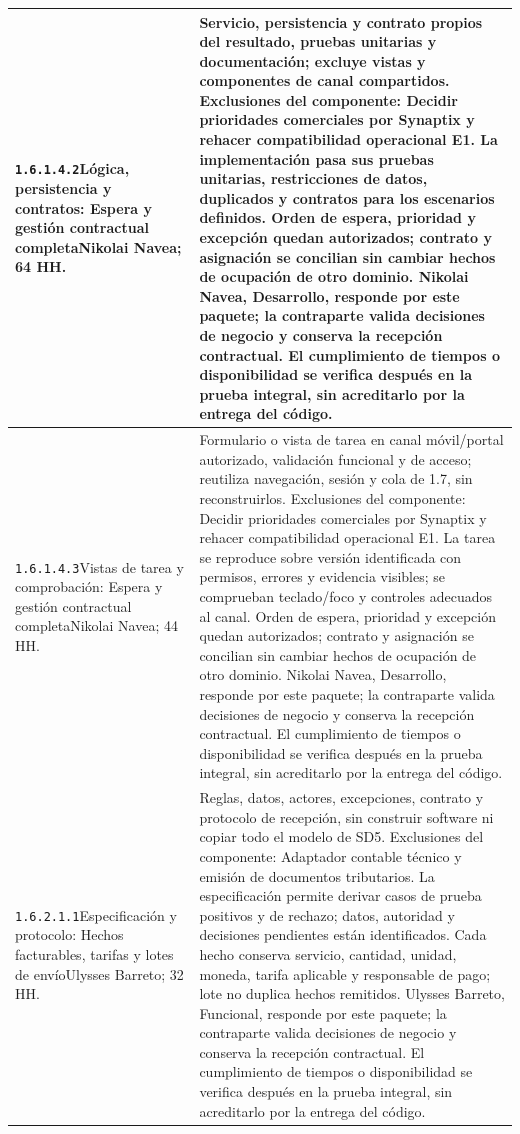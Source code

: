 \begin{longtable}{L{52mm}L{91mm}}
\texttt{1.\allowbreak{}6.\allowbreak{}1.\allowbreak{}4.\allowbreak{}2}\newline Lógica, persistencia y contratos: Espera y gestión contractual completa\newline Nikolai Navea; 64 HH. & Servicio, persistencia y contrato propios del resultado, pruebas unitarias y documentación; excluye vistas y componentes de canal compartidos. Exclusiones del componente: Decidir prioridades comerciales por Synaptix y rehacer compatibilidad operacional E1. La implementación pasa sus pruebas unitarias, restricciones de datos, duplicados y contratos para los escenarios definidos. Orden de espera, prioridad y excepción quedan autorizados; contrato y asignación se concilian sin cambiar hechos de ocupación de otro dominio. Nikolai Navea, Desarrollo, responde por este paquete; la contraparte valida decisiones de negocio y conserva la recepción contractual. El cumplimiento de tiempos o disponibilidad se verifica después en la prueba integral, sin acreditarlo por la entrega del código.\\\hline
\texttt{1.\allowbreak{}6.\allowbreak{}1.\allowbreak{}4.\allowbreak{}3}\newline Vistas de tarea y comprobación: Espera y gestión contractual completa\newline Nikolai Navea; 44 HH. & Formulario o vista de tarea en canal móvil/portal autorizado, validación funcional y de acceso; reutiliza navegación, sesión y cola de 1.7, sin reconstruirlos. Exclusiones del componente: Decidir prioridades comerciales por Synaptix y rehacer compatibilidad operacional E1. La tarea se reproduce sobre versión identificada con permisos, errores y evidencia visibles; se comprueban teclado/foco y controles adecuados al canal. Orden de espera, prioridad y excepción quedan autorizados; contrato y asignación se concilian sin cambiar hechos de ocupación de otro dominio. Nikolai Navea, Desarrollo, responde por este paquete; la contraparte valida decisiones de negocio y conserva la recepción contractual. El cumplimiento de tiempos o disponibilidad se verifica después en la prueba integral, sin acreditarlo por la entrega del código.\\\hline
\texttt{1.\allowbreak{}6.\allowbreak{}2.\allowbreak{}1.\allowbreak{}1}\newline Especificación y protocolo: Hechos facturables, tarifas y lotes de envío\newline Ulysses Barreto; 32 HH. & Reglas, datos, actores, excepciones, contrato y protocolo de recepción, sin construir software ni copiar todo el modelo de SD5. Exclusiones del componente: Adaptador contable técnico y emisión de documentos tributarios. La especificación permite derivar casos de prueba positivos y de rechazo; datos, autoridad y decisiones pendientes están identificados. Cada hecho conserva servicio, cantidad, unidad, moneda, tarifa aplicable y responsable de pago; lote no duplica hechos remitidos. Ulysses Barreto, Funcional, responde por este paquete; la contraparte valida decisiones de negocio y conserva la recepción contractual. El cumplimiento de tiempos o disponibilidad se verifica después en la prueba integral, sin acreditarlo por la entrega del código.\\\hline

\end{longtable}
